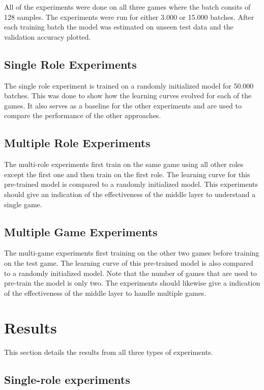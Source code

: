 \documentclass[twocolumn, letterpaper, 10 pt, conference]{ieeeconf}  %
\begin{document}
    All of the experiments were done on all three games where the batch consits of 128 samples. The experiments were run for either 3.000 or 15.000 batches. After each training batch the model was estimated on unseen test data and the validation accuracy plotted.  
    
    \subsection{Single Role Experiments}
        The single role experiment is trained on a randomly initialized model for 50.000 batches. This was done to show how the learning curves evolved for each of the games. It also serves as a baseline for the other experiments and are used to compare the performance of the other approaches. 
    
    \subsection{Multiple Role Experiments}
        The multi-role experiments first train on the same game using all other roles except the first one and then train on the first role. The learning curve for this pre-trained model is compared to a randomly initialized model. This experiments should give an indication of the effectiveness of the middle layer to understand a single game.
    
    \subsection{Multiple Game Experiments}
        The multi-game experiments first training on the other two games before training on the test game. The learning curve of this pre-trained model is also compared to a randomly initialized model. Note that the number of games that are used to pre-train the model is only two. The experiments should likewise give a indication of the effectiveness of the middle layer to handle multiple games. 


\section{Results}
This section details the results from all three types of experiments. 

\subsection{Single-role experiments}
\end{document}
